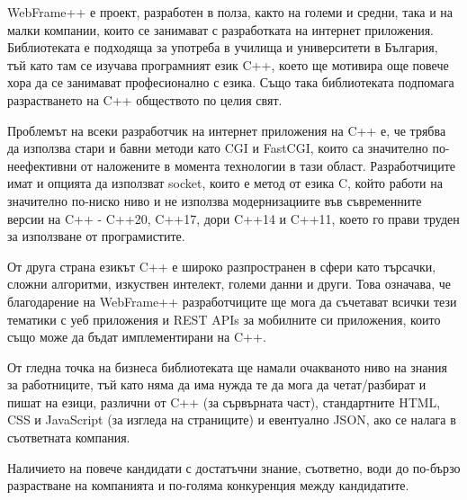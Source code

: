 \documentclass[documentation.tex]{subfiles}
\begin{document}
	\begin{text}\par
WebFrame++ е проект, разработен в полза, както на големи и средни, така и на малки компании, които се занимават с разработката на интернет приложения. Библиотеката е подходяща за употреба в училища и университети в България, тъй като там се изучава програмният език C++,  което ще мотивира още повече хора да се занимават професионално с езика. Също така библиотеката подпомага разрастването на C++ обществото по целия свят.\par
Проблемът на всеки разработчик на интернет приложения на C++ е, че трябва да използва стари и бавни методи като CGI и FastCGI, които са значително по-неефективни от наложените в момента технологии в тази област. Разработчиците имат и опцията да използват socket, които е метод от езика C, който работи на значително по-ниско ниво и не използва модернизациите във съвременните версии на C++ - C++20, C++17, дори C++14 и C++11, което го прави труден за използване от програмистите.\par
От друга страна езикът C++ е широко разпространен в сфери като търсачки, сложни алгоритми, изкуствен интелект, големи данни и други. Това означава, че благодарение на WebFrame++ разработчиците ще мога да съчетават всички тези тематики с уеб приложения и REST APIs за мобилните си приложения, които също може да бъдат имплементирани на C++.\par
От гледна точка на бизнеса библиотеката ще намали очакваното ниво на знания за работниците, тъй като няма да има нужда те да мога да четат/разбират и пишат на езици, различни от C++ (за сървърната част), стандартните HTML, CSS и JavaScript (за изгледа на страниците) и евентуално JSON, ако се налага в съответната компания.\par
Наличието на повече кандидати с достатъчни знание, съответно, води до по-бързо разрастване на компанията и по-голяма конкуренция между кандидатите.
    \end{text}
    \newpage
\end{document}
